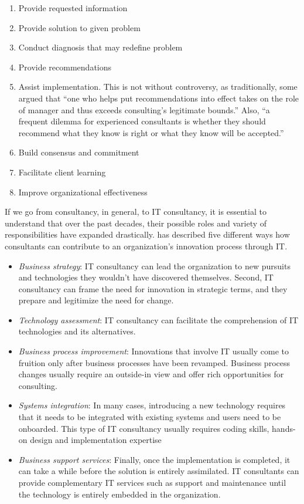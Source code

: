 \documentclass[12pt]{article}
\providecommand{\tightlist}{%
  \setlength{\itemsep}{0pt}\setlength{\parskip}{0pt}}
\begin{document}
\begin{enumerate}
\def\labelenumi{\arabic{enumi}.}
\tightlist
\item
  Provide requested information
\item
  Provide solution to given problem
\item
  Conduct diagnosis that may redefine problem
\item
  Provide recommendations
\item
  Assist implementation. This is not without controversy, as
  traditionally, some argued that ``one who helps put recommendations
  into effect takes on the role of manager and thus exceeds consulting's
  legitimate bounds.'' Also, ``a frequent dilemma for experienced
  consultants is whether they should recommend what they know is right
  or what they know will be accepted.''
\item
  Build consensus and commitment
\item
  Facilitate client learning
\item
  Improve organizational effectiveness
\end{enumerate}

If we go from consultancy, in general, to IT consultancy, it is
essential to understand that over the past decades, their possible roles
and variety of responsibilities have expanded drastically.
\citet[20-25]{swanson2010} has described five different ways how
consultants can contribute to an organization's innovation process
through IT.

\begin{itemize}
\tightlist
\item
  \emph{Business strategy}: IT consultancy can lead the organization to
  new pursuits and technologies they wouldn't have discovered
  themselves. Second, IT consultancy can frame the need for innovation
  in strategic terms, and they prepare and legitimize the need for
  change.
\item
  \emph{Technology assessment}: IT consultancy can facilitate the
  comprehension of IT technologies and its alternatives.
\item
  \emph{Business process improvement}: Innovations that involve IT
  usually come to fruition only after business processes have been
  revamped. Business process changes usually require an outside-in view
  and offer rich opportunities for consulting.
\item
  \emph{Systems integration}: In many cases, introducing a new
  technology requires that it needs to be integrated with existing
  systems and users need to be onboarded. This type of IT consultancy
  usually requires coding skills, hands-on design and implementation
  expertise
\item
  \emph{Business support services}: Finally, once the implementation is
  completed, it can take a while before the solution is entirely
  assimilated. IT consultants can provide complementary IT services such
  as support and maintenance until the technology is entirely embedded
  in the organization.
\end{itemize}
\end{document}
